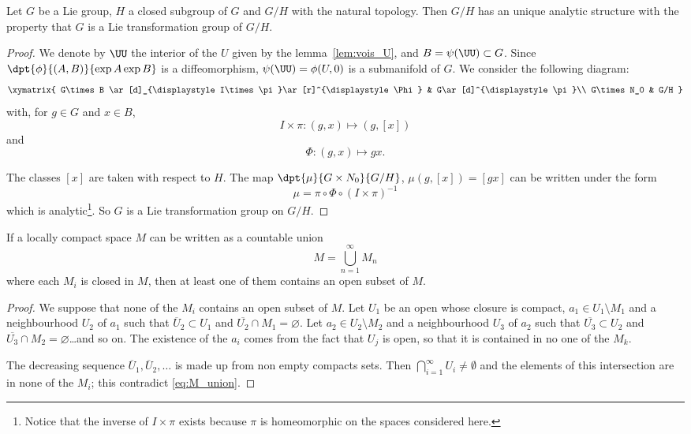 \begin{theorem}\label{Helgason4.2}\label{tho:struc_anal}
Let $G$ be a Lie group, $H$ a closed subgroup of $G$ and $G/H$ with the natural topology. Then $G/H$ has an unique analytic structure with the property that $G$ is a Lie transformation group of $G/H$.
\end{theorem}

\begin{proof}
We denote by $\UU$ the interior of the $U$ given by the lemma~\ref{lem:vois_U}, and $B=\psi(\UU)\subset G$. Since $\dpt{\phi}{(A,B)}{\exp A\exp B}$ is a diffeomorphism, $\psi(\UU)=\phi(U,0)$ is a submanifold of $G$. We consider the following diagram:
\[
\xymatrix{
    G\times B  \ar[d]_{\displaystyle I\times\pi}\ar[r]^{\displaystyle\Phi}    &
                                                                     G\ar[d]^{\displaystyle\pi}\\
    G\times N_0 &                                                             G/H
  }\]
with, for $g\in G$ and $x\in B$,
\[
I\times\pi\colon (g,x)\mapsto (g,[x])
\]
and
\[
\Phi\colon (g,x)\mapsto gx.
\]

\noindent The classes $[x]$ are taken with respect to $H$. The map $\dpt{\mu}{G\times N_0}{G/H}$, $\mu(g,[x])=[gx]$ can be written under the form
\[
   \mu=\pi\circ\Phi\circ(I\times\pi)^{-1}
\]
which is analytic\footnote{Notice that the inverse of $I\times\pi$ exists because $\pi$ is homeomorphic on the spaces considered here.}. So $G$ is a Lie transformation group on $G/H$.

\end{proof}


\begin{lemma} \label{lem:categ}
If a locally compact space $M$ can be written as a countable union
\begin{equation}\label{eq:M_union}
   M=\bigcup_{n=1}^{\infty}M_n
\end{equation}
where each $M_i$ is closed in $M$, then at least one of them contains an open subset of $M$.
\end{lemma}

\begin{proof}
We suppose that none of the $M_i$ contains an open subset of $M$. Let $U_1$ be an open whose closure is compact, $a_1\in U_1\setminus M_1$ and a neighbourhood $U_2$ of $a_1$ such that $\overline{U}_2\subset U_1$ and $\overline{U_2}\cap M_1=\varnothing$. Let $a_2\in U_2\setminus M_2$ and a neighbourhood $U_3$ of $a_2$ such that $\overline{U_3}\subset U_2$ and $\overline{U_3}\cap M_2=\varnothing$\ldots and so on. The existence of the $a_i$ comes from the fact that $U_j$ is open, so that it is contained in no one of the $M_k$.

The decreasing sequence $\overline{U}_1,\overline{U}_2 ,\ldots$ is made up from non empty compacts sets. Then $\bigcap_{i=1}^{\infty}U_i\neq\emptyset$ and the elements of this intersection are in none of the $M_i$; this contradict \eqref{eq:M_union}.
\end{proof}


